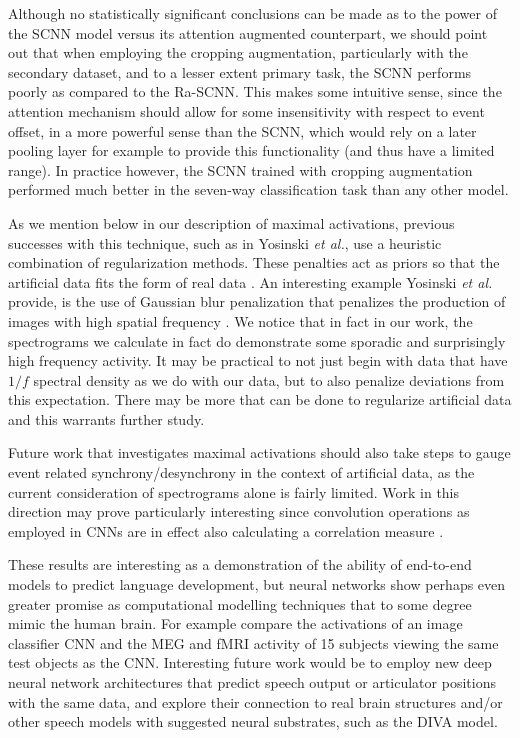 \documentclass[fleqn,10pt]{wlscirep}
\begin{document}
Although no statistically significant conclusions can be made as to the power of the SCNN model versus its attention augmented counterpart, we should point out that when employing the cropping augmentation, particularly with the secondary dataset, and to a lesser extent primary task, the SCNN performs poorly as compared to the Ra-SCNN. This makes some intuitive sense, since the attention mechanism should allow for some insensitivity with respect to event offset, in a more powerful sense than the SCNN, which would rely on a later pooling layer for example to provide this functionality (and thus have a limited range). In practice however, the SCNN trained with cropping augmentation performed much better in the seven-way classification task than any other model.

As we mention below in our description of maximal activations, previous successes with this technique, such as in Yosinski {\em et al.}, use a heuristic combination of regularization methods. These penalties act as priors so that the artificial data fits the form of real data \cite{Yosinski2015}. An interesting example Yosinski {\em et al.} provide, is the use of Gaussian blur penalization that penalizes the production of images with high spatial frequency \cite{Yosinski2015}. We notice that in fact in our work, the spectrograms we calculate in fact do demonstrate some sporadic and surprisingly high frequency activity. It may be practical to not just begin with data that have $1/f$ spectral density as we do with our data, but to also penalize deviations from this expectation. There may be more that can be done to regularize artificial data and this warrants further study.

Future work that investigates maximal activations should also take steps to gauge event related synchrony/desynchrony in the context of artificial data, as the current consideration of spectrograms alone is fairly limited. Work in this direction may prove particularly interesting since convolution operations as employed in CNNs are in effect also calculating a correlation measure \cite{GravesRNNBook}.

These results are interesting as a demonstration of the ability of end-to-end models to predict language development, but neural networks show perhaps even greater promise as computational modelling techniques that to some degree mimic the human brain. For example \cite{cichy2016} compare the activations of an image classifier CNN and the MEG and fMRI activity of 15 subjects viewing the same test objects as the CNN. Interesting future work would be to employ new deep neural network architectures that predict speech output or articulator positions with the same data, and explore their connection to real brain structures and/or other speech models with suggested neural substrates, such as the DIVA model\cite{Guenther2005}.
\end{document}
